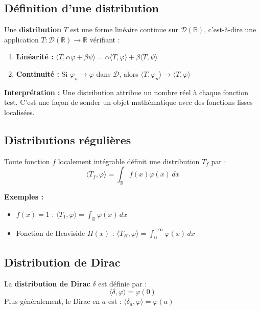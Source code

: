 \documentclass[11pt,a4paper]{report}
\newcommand{\Distr}{\mathcal{D}}
\begin{document}
\subsection*{Définition d'une distribution}

\begin{tcolorbox}[colback=ThemeLight, colframe=Theme, title=Définition : Distribution]
Une \textbf{distribution} $T$ est une forme linéaire continue sur $\Distr(\mathbb{R})$, c'est-à-dire une application $T : \Distr(\mathbb{R}) \to \mathbb{R}$ vérifiant :
\begin{enumerate}
    \item \textbf{Linéarité :} $\langle T, \alpha\varphi + \beta\psi \rangle = \alpha \langle T, \varphi \rangle + \beta \langle T, \psi \rangle$
    \item \textbf{Continuité :} Si $\varphi_n \to \varphi$ dans $\Distr$, alors $\langle T, \varphi_n \rangle \to \langle T, \varphi \rangle$
\end{enumerate}
\end{tcolorbox}

\textbf{Interprétation :} Une distribution attribue un nombre réel à chaque fonction test. C'est une façon de \og  sonder \fg{}  un objet mathématique avec des fonctions lisses localisées.

\subsection*{Distributions régulières}

Toute fonction $f$ localement intégrable définit une distribution $T_f$ par :
\[
\langle T_f, \varphi \rangle = \int_{\mathbb{R}} f(x) \varphi(x) \, dx
\]

\textbf{Exemples :}
\begin{itemize}
    \item $f(x) = 1$ : $\langle T_1, \varphi \rangle = \int_{\mathbb{R}} \varphi(x) \, dx$
    \item Fonction de Heaviside $H(x)$ : $\langle T_H, \varphi \rangle = \int_0^{+\infty} \varphi(x) \, dx$
\end{itemize}

\subsection*{Distribution de Dirac}

\begin{tcolorbox}[colback=ThemeLight, colframe=Theme, title=Définition : Distribution de Dirac]
La \textbf{distribution de Dirac} $\delta$ est définie par :
\[
\langle \delta, \varphi \rangle = \varphi(0)
\]
Plus généralement, le Dirac en $a$ est : $\langle \delta_a, \varphi \rangle = \varphi(a)$
\end{tcolorbox}
\end{document}
